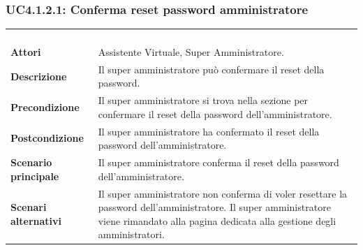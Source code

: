 \subsubsection{UC4.1.2.1: Conferma reset password amministratore}
\label{UC4.1.2.1}
\begin{longtable}{l|p{10cm}}
	\rowcolor[gray]{0.8} \multicolumn{2}{c}{} \\
	\rowcolor[gray]{0.8} \multicolumn{2}{c}{\textbf{UC4.1.2.1 - Conferma reset password amministratore}} \\
	\rowcolor[gray]{0.8} \multicolumn{2}{c}{} \\
	\hline
	&\\
	\textbf{Attori} & Assistente Virtuale, Super Amministratore.\\[7pt]
	\textbf{Descrizione} & Il super amministratore può confermare il reset della password.\\[7pt]
	\textbf{Precondizione} & Il super amministratore si trova nella sezione per confermare il reset della password dell'amministratore.\\[7pt]
	\textbf{Postcondizione} & Il super amministratore ha confermato il reset della password dell'amministratore.\\[7pt]
	\textbf{Scenario principale} &Il super amministratore conferma il reset della password dell'amministratore.\\[7pt]
	\textbf{Scenari alternativi} & Il super amministratore non conferma di voler resettare la password dell'amministratore. Il super amministratore viene rimandato alla pagina dedicata alla gestione degli amministratori.\\[7pt]\hline
\end{longtable}


